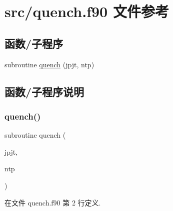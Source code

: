 \hypertarget{quench_8f90}{}\section{src/quench.f90 文件参考}
\label{quench_8f90}
\subsection*{函数/子程序}
\begin{DoxyCompactItemize}
\item 
subroutine \mbox{\hyperlink{quench_8f90_abed4820fe11150754b89d06f48197f78}{quench}} (jpjt, ntp)
\end{DoxyCompactItemize}


\subsection{函数/子程序说明}
\mbox{\label{quench_8f90_abed4820fe11150754b89d06f48197f78}} 
\subsubsection{\texorpdfstring{quench()}{quench()}}
{\footnotesize\ttfamily subroutine quench (\begin{DoxyParamCaption}\item[{}]{jpjt,  }\item[{}]{ntp }\end{DoxyParamCaption})}



在文件 quench.\+f90 第 2 行定义.


